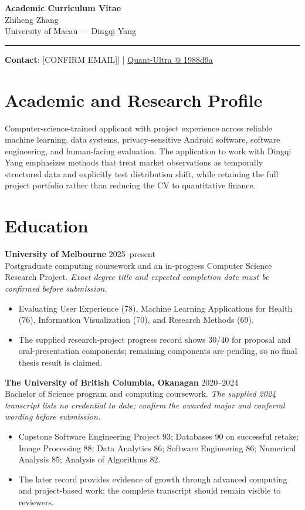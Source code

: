 \documentclass[11pt]{article}
\makeatletter
\newcommand{\ApplicantName}{Zhiheng Zhang}
\newcommand{\ApplicantEmail}{[CONFIRM EMAIL]}
\newcommand{\ApplicantPhone}{[CONFIRM PHONE]}
\newcommand{\ApplicantGitHub}{\href{https://github.com/zhiheng-zhang-Mera/Quant-Ultra/tree/1988d9a8530da91a8158de864d098ea869098923}{Quant-Ultra @ 1988d9a}}
\makeatother
\begin{document}
\begin{center}
{\LARGE\bfseries Academic Curriculum Vitae}\\[0.25em]
{\large \ApplicantName}\\
University of Macau --- Dingqi Yang
\end{center}
\vspace{0.35em}\hrule\vspace{0.65em}

\textbf{Contact}: \ApplicantEmail\quad | \quad \ApplicantPhone\quad | \quad \ApplicantGitHub

\section*{Academic and Research Profile}
Computer-science-trained applicant with project experience across reliable machine learning, data systems, privacy-sensitive Android software, software engineering, and human-facing evaluation. The application to work with Dingqi Yang emphasizes methods that treat market observations as temporally structured data and explicitly test distribution shift, while retaining the full project portfolio rather than reducing the CV to quantitative finance.

\section*{Education}
\textbf{University of Melbourne} \hfill 2025--present\\
Postgraduate computing coursework and an in-progress Computer Science Research Project. \textit{Exact degree title and expected completion date must be confirmed before submission.}
\begin{itemize}
\item Evaluating User Experience (78), Machine Learning Applications for Health (76), Information Visualization (70), and Research Methods (69).
\item The supplied research-project progress record shows 30/40 for proposal and oral-presentation components; remaining components are pending, so no final thesis result is claimed.
\end{itemize}

\textbf{The University of British Columbia, Okanagan} \hfill 2020--2024\\
Bachelor of Science program and computing coursework. \textit{The supplied 2024 transcript lists no credential to date; confirm the awarded major and conferral wording before submission.}
\begin{itemize}
\item Capstone Software Engineering Project 93; Databases 90 on successful retake; Image Processing 88; Data Analytics 86; Software Engineering 86; Numerical Analysis 85; Analysis of Algorithms 82.
\item The later record provides evidence of growth through advanced computing and project-based work; the complete transcript should remain visible to reviewers.
\end{itemize}
\end{document}
